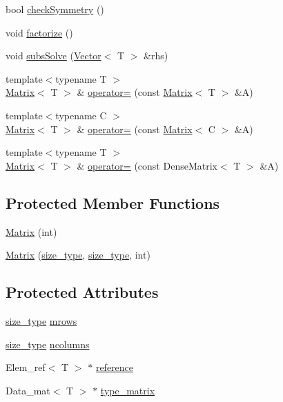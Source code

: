 \begin{DoxyCompactItemize}
bool \hyperlink{classMatrix_aed9270dd5f211e6e1a5989d61184e744}{check\-Symmetry} ()
\item 
void \hyperlink{classMatrix_a5ccbd055f0ae0377196ddabb0d1b03f7}{factorize} ()
\item 
void \hyperlink{classMatrix_a22d183d83bb9bf1cd5feea309f3a665e}{subs\-Solve} (\hyperlink{classVector}{Vector}$<$ T $>$ \&rhs)
\item 
{\footnotesize template$<$typename T $>$ }\\\hyperlink{classMatrix}{Matrix}$<$ T $>$ \& \hyperlink{classMatrix_a0d9e03ae35ffa4667afa1075f2684a64}{operator=} (const \hyperlink{classMatrix}{Matrix}$<$ T $>$ \&A)
\item 
{\footnotesize template$<$typename C $>$ }\\\hyperlink{classMatrix}{Matrix}$<$ T $>$ \& \hyperlink{classMatrix_a07c1d963d1e98ff20ac96711d357f42d}{operator=} (const \hyperlink{classMatrix}{Matrix}$<$ C $>$ \&A)
\item 
{\footnotesize template$<$typename T $>$ }\\\hyperlink{classMatrix}{Matrix}$<$ T $>$ \& \hyperlink{classMatrix_a3f2deb42b24254e639bca3ea50e2cdd5}{operator=} (const Dense\-Matrix$<$ T $>$ \&A)
\end{DoxyCompactItemize}
\subsection*{Protected Member Functions}
\begin{DoxyCompactItemize}
\item 
\hyperlink{classMatrix_ad49f0060c68e71cdda695406d6f229f8}{Matrix} (int)
\item 
\hyperlink{classMatrix_aeee342d4728ae708002d7e4d976d95f5}{Matrix} (\hyperlink{lmx__mat__data_8h_a49b489a408a211a90e766329c0732d7b}{size\-\_\-type}, \hyperlink{lmx__mat__data_8h_a49b489a408a211a90e766329c0732d7b}{size\-\_\-type}, int)
\end{DoxyCompactItemize}
\subsection*{Protected Attributes}
\begin{DoxyCompactItemize}
\item 
\hyperlink{lmx__mat__data_8h_a49b489a408a211a90e766329c0732d7b}{size\-\_\-type} \hyperlink{classMatrix_a0b283aced337f3c94db50bc459d28580}{mrows}
\item 
\hyperlink{lmx__mat__data_8h_a49b489a408a211a90e766329c0732d7b}{size\-\_\-type} \hyperlink{classMatrix_a05a070e7ed8f3289d72c71b47888bef2}{ncolumns}
\item 
Elem\-\_\-ref$<$ T $>$ $\ast$ \hyperlink{classMatrix_a0294600ba30c0665efcaeb77bbcad7fa}{reference}
\item 
Data\-\_\-mat$<$ T $>$ $\ast$ \hyperlink{classMatrix_a3ea7741164284aaa1ad49dec89a2d309}{type\-\_\-matrix}
\end{DoxyCompactItemize}
